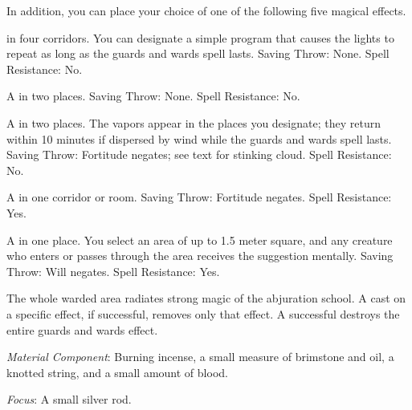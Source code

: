 {	In addition, you can place your choice of one of the following five magical effects.

	\begin{enumerate*}
		\item {} in four corridors. You can designate a simple program that causes the lights to repeat as long as the guards and wards spell lasts. Saving Throw: None. Spell Resistance: No.
		\item A  in two places. Saving Throw: None. Spell Resistance: No.
		\item A  in two places. The vapors appear in the places you designate; they return within 10 minutes if dispersed by wind while the guards and wards spell lasts. Saving Throw: Fortitude negates; see text for stinking cloud. Spell Resistance: No.
		\item A  in one corridor or room. Saving Throw: Fortitude negates. Spell Resistance: Yes.
		\item A  in one place. You select an area of up to 1.5 meter square, and any creature who enters or passes through the area receives the suggestion mentally. Saving Throw: Will negates. Spell Resistance: Yes.
	\end{enumerate*}

	The whole warded area radiates strong magic of the abjuration school. A  cast on a specific effect, if successful, removes only that effect. A successful  destroys the entire guards and wards effect.

	\textit{Material Component}:
	Burning incense, a small measure of brimstone and oil, a knotted string, and a small amount of blood.

	\textit{Focus}:
	A small silver rod.

}
